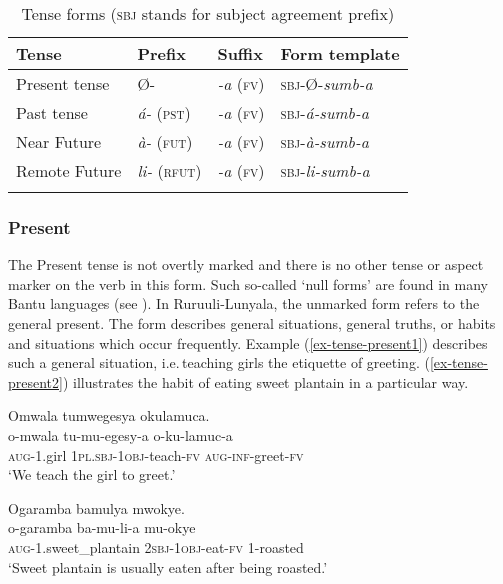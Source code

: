 \begin{table}[!h]
\caption{Tense forms (\textsc{sbj} stands for subject agreement prefix)}
\label{tab-verb-tense}
	\begin{tabular}{llll}
\lsptoprule

Tense  & Prefix  & Suffix  & Form template\\
\midrule
Present tense  & Ø- & \textit{-a} (\textsc{fv}) & \textsc{sbj}-Ø-\textit{sumb-a}\\
Past tense  & \textit{á-} (\textsc{pst}) & \textit{-a} (\textsc{fv}) & \textsc{sbj}-\textit{á-sumb-a}\\
Near Future  & \textit{à-} (\textsc{fut}) & \textit{-a} (\textsc{fv}) & \textsc{sbj}-\textit{à-sumb-a}\\
Remote Future  & \textit{li-} (\textsc{rfut}) & \textit{-a} (\textsc{fv}) &\textsc{sbj}-\textit{li-sumb-a}\\
\lspbottomrule
	\end{tabular}
\end{table}

\subsubsection{Present}
The Present tense is not overtly marked and there is no other tense or aspect marker on the verb in this form. 
Such so-called `null forms' are found in many Bantu languages (see \citealt[118]{Nurse2008Tense}).
In Ru\-ruu\-li\hyp{}Lu\-nya\-la, the unmarked form refers to the general present. 
The form describes general situations, general truths, or habits and situations which occur frequently. 
Example (\ref{ex-tense-present1}) describes such a general situation, i.e.\,teaching girls the etiquette of greeting. (\ref{ex-tense-present2}) illustrates the habit of eating sweet plantain in a particular way. 

\ea \label{ex-tense-present}
\begin{xlist}
\ex	\label{ex-tense-present1}
	\glll Omwala tumwegesya okulamuca.\\
	o-mwala      tu-mu-egesy-a     o-ku-lamuc-a\\
		\textsc{aug}-1.girl     1\textsc{pl.sbj}-\textsc{1obj}-teach-\textsc{fv}     \textsc{aug}-\textsc{inf}-greet-\textsc{fv}\\
	\glt ‘We teach the girl to greet.’
	
\ex	\label{ex-tense-present2}
	\glll Ogaramba bamulya mwokye.\\
	o-garamba ba-mu-li-a mu-okye\\
		\textsc{aug}-1.sweet\_plantain \textsc{2sbj}-\textsc{1obj}-eat-\textsc{fv} 1-roasted\\
	\glt  ‘Sweet plantain is usually eaten after being roasted.’
\end{xlist}
\z


